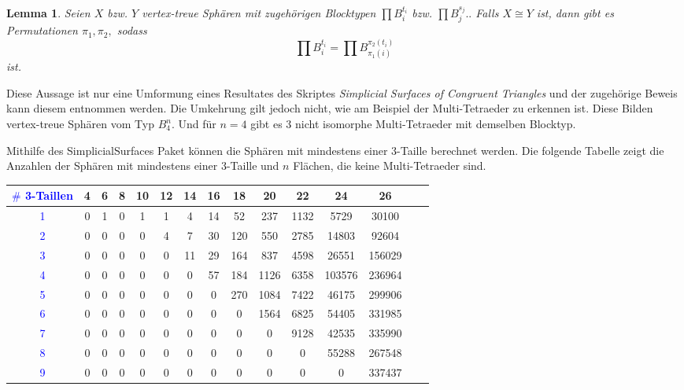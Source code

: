 \documentclass[12pt,titlepage,twoside,cleardoublepage]{article}
\theoremstyle{nummermitklammern}
\newtheorem{lemma}[temp]{Lemma}
\newtheorem{lemma}[zahl]{Lemma}
\numberwithin{equation}{section}
\begin{document}
\begin{lemma}
Seien $X$ bzw. $Y$ vertex-treue Sphären mit zugehörigen Blocktypen $\prod B_i^{t_i}$ bzw. $\prod B_j^{s_j}..$ Falls $X\cong Y$ ist, dann gibt es Permutationen $\pi_1,\pi_2,$ sodass 
\[
\prod B_i^{t_i}=\prod B_{\pi_1(i)}^{\pi_2(t_i)}
\]  
ist.
\end{lemma}
Diese Aussage ist nur eine Umformung eines Resultates des Skriptes \emph{Simplicial Surfaces of Congruent Triangles} und der zugehörige Beweis kann diesem entnommen werden. Die Umkehrung gilt jedoch nicht, wie am Beispiel der Multi-Tetraeder zu erkennen ist. Diese Bilden vertex-treue Sphären vom Typ $B_4^n.$ Und für $n=4$ gibt es 3 nicht isomorphe Multi-Tetraeder mit demselben Blocktyp.

Mithilfe des SimplicialSurfaces Paket können die Sphären mit mindestens einer 3-Taille berechnet werden. Die folgende Tabelle zeigt die Anzahlen der Sphären mit mindestens einer 3-Taille und $n$ Flächen, die keine Multi-Tetraeder sind. 
\begin{center}
\begin{tabular}{|c|c|c|c|c|c|c|c|c|c|c|c|c|c|c|}
\hline
\textcolor{blue}{$\#$ 3-Taillen }&\textbf{4}& \textbf{6}& \textbf{8}& \textbf{10}& \textbf{12}& \textbf{14}& \textbf{16}& \textbf{18}& \textbf{20}& \textbf{22}& \textbf{24}& \textbf{26}\\
\hline
\textcolor{blue}{1} &0& 1& 0& 1& 1& 4& 14& 52& 237& 1132& 5729& 30100\\
\hline
\textcolor{blue}{2} &0& 0& 0 &0& 4& 7& 30& 120& 550& 2785& 14803& 92604\\
\hline
\textcolor{blue}{3}& 0& 0& 0& 0& 0& 11& 29& 164& 837& 4598& 26551& 156029\\
\hline
\textcolor{blue}{4}& 0& 0& 0& 0& 0& 0& 57& 184& 1126& 6358& 103576& 236964\\
\hline
\textcolor{blue}{5}& 0& 0& 0& 0& 0& 0& 0& 270& 1084& 7422& 46175& 299906\\
\hline
\textcolor{blue}{6} &0& 0& 0& 0& 0& 0& 0& 0 &1564& 6825& 54405& 331985\\
\hline
\textcolor{blue}{7}& 0& 0& 0& 0& 0& 0& 0& 0& 0& 9128& 42535& 335990\\
\hline
\textcolor{blue}{8}& 0& 0& 0& 0& 0& 0& 0& 0& 0& 0& 55288& 267548\\
\hline
\textcolor{blue}{9} &0& 0& 0& 0& 0& 0& 0& 0& 0& 0& 0& 337437\\
\hline
\end{tabular}
\end{center}

\end{document}
